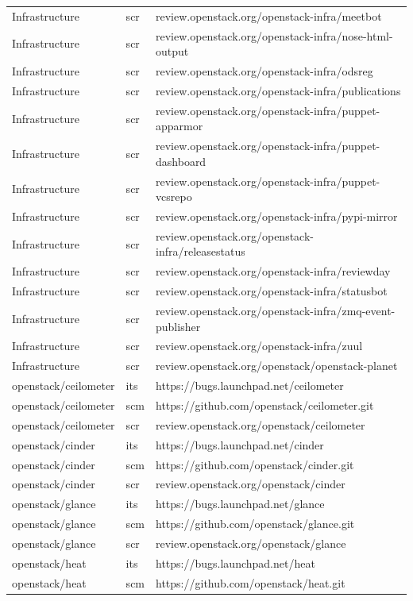 \documentclass[a4wide,11pt]{report}
\begin{document}
\begin{center}
\begin{longtable}{|p{4cm}|p{1cm}|p{10cm}|}
Infrastructure&scr&review.openstack.org/openstack-infra/meetbot\\ 
Infrastructure&scr&review.openstack.org/openstack-infra/nose-html-output\\ 
Infrastructure&scr&review.openstack.org/openstack-infra/odsreg\\ 
Infrastructure&scr&review.openstack.org/openstack-infra/publications\\ 
Infrastructure&scr&review.openstack.org/openstack-infra/puppet-apparmor\\ 
Infrastructure&scr&review.openstack.org/openstack-infra/puppet-dashboard\\ 
Infrastructure&scr&review.openstack.org/openstack-infra/puppet-vcsrepo\\ 
Infrastructure&scr&review.openstack.org/openstack-infra/pypi-mirror\\ 
Infrastructure&scr&review.openstack.org/openstack-infra/releasestatus\\ 
Infrastructure&scr&review.openstack.org/openstack-infra/reviewday\\ 
Infrastructure&scr&review.openstack.org/openstack-infra/statusbot\\ 
Infrastructure&scr&review.openstack.org/openstack-infra/zmq-event-publisher\\ 
Infrastructure&scr&review.openstack.org/openstack-infra/zuul\\ 
Infrastructure&scr&review.openstack.org/openstack/openstack-planet\\ 
openstack/ceilometer&its&https://bugs.launchpad.net/ceilometer\\ 
openstack/ceilometer&scm&https://github.com/openstack/ceilometer.git\\ 
openstack/ceilometer&scr&review.openstack.org/openstack/ceilometer\\ 
openstack/cinder&its&https://bugs.launchpad.net/cinder\\ 
openstack/cinder&scm&https://github.com/openstack/cinder.git\\ 
openstack/cinder&scr&review.openstack.org/openstack/cinder\\ 
openstack/glance&its&https://bugs.launchpad.net/glance\\ 
openstack/glance&scm&https://github.com/openstack/glance.git\\ 
openstack/glance&scr&review.openstack.org/openstack/glance\\ 
openstack/heat&its&https://bugs.launchpad.net/heat\\ 
openstack/heat&scm&https://github.com/openstack/heat.git\\ 

\end{longtable}
\end{center}
\end{document}
